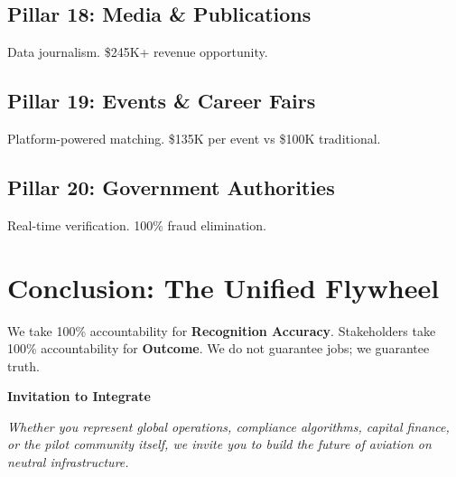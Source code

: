\documentclass[11pt, a4paper]{article}
\begin{document}
\subsection{Pillar 18: Media \& Publications}
Data journalism. \$245K+ revenue opportunity.

\subsection{Pillar 19: Events \& Career Fairs}
Platform-powered matching. \$135K per event vs \$100K traditional.

\subsection{Pillar 20: Government Authorities}
Real-time verification. 100\% fraud elimination.

\section{Conclusion: The Unified Flywheel}

We take 100\% accountability for \textbf{Recognition Accuracy}. Stakeholders take 100\% accountability for \textbf{Outcome}. We do not guarantee jobs; we guarantee truth.

\vspace{1cm}
\begin{mdframed}[linecolor=prNavy, linewidth=2pt, backgroundcolor=prGray]
\begin{center}
\Large\textbf{Invitation to Integrate}
\end{center}
\textit{Whether you represent global operations, compliance algorithms, capital finance, or the pilot community itself, we invite you to build the future of aviation on neutral infrastructure.}
\end{mdframed}
\end{document}
